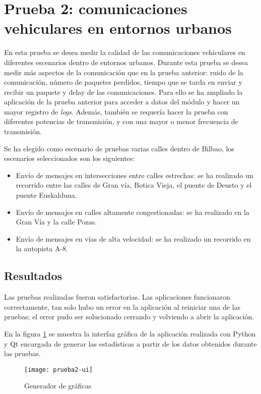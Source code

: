 \section{Prueba 2: comunicaciones vehiculares en entornos urbanos}
En esta prueba se desea medir la calidad de las comunicaciones vehiculares
en diferentes escenarios dentro de entornos urbanos. Durante esta prueba
se desea medir más aspectos de la comunicación que en la prueba anterior:
ruido de la comunicación, número de paquetes perdidos, tiempo que se tarda
en enviar y recibir un paquete y delay de las comunicaciones. Para ello se
ha ampliado la aplicación de la prueba anterior para acceder a datos del
módulo y hacer un mayor registro de \emph{logs}. Además, también se requería
hacer la prueba con diferentes potencias de transmisión, y con una mayor
o menor frecuencia de transmisión.

Se ha elegido como escenario de pruebas varias calles dentro de Bilbao, los
escenarios seleccionados son los siguientes:
\begin{itemize}
	\item Envío de mensajes en intersecciones entre calles estrechas: se ha
	realizado un recorrido entre las calles de Gran vía, Botica Vieja, el 
	puente de Deusto y el puente Euskalduna.
	\item Envío de mensajes en calles altamente congestionadas: se ha realizado
	en la Gran Vía y la calle Pozas.
	\item Envío de mensajes en vías de alta velocidad: se ha realizado un
	recorrido en la	autopista A-8.
\end{itemize}

\subsection{Resultados}
Las pruebas realizadas fueron satisfactorias. Las aplicaciones funcionaron
correctamente, tan solo hubo un error en la aplicación al reiniciar una de 
las pruebas; el error pudo ser solucionado cerrando y volviendo a abrir
la aplicación.

En la figura \ref{fig:prueba2-ui} se muestra la interfaz gráfica de la
aplicación realizada con Python y Qt encargada de generar las estadísticas
a partir de los datos obtenidos durante las pruebas.

\begin{figure}[H]
	\begin{center}
		\texttt{[image: prueba2-ui]}
		\caption{Generador de gráficas}
		\label{fig:prueba2-ui}
	\end{center}
\end{figure}